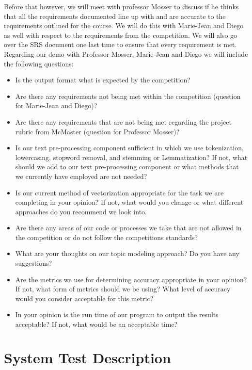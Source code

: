 \documentclass[12pt, titlepage]{article}
\begin{document}
  Before that however, we will meet with professor Mosser to discuss if he thinks that all the requirements documented line up with and are accurate to the requirements outlined for the course. We will do this with Marie-Jean and Diego as well with respect to the requirements from the competition. We will also go over the SRS document one last time to ensure that every requirement is met. \\  
  
  Regarding our demo with Professor Mosser, Marie-Jean and Diego we will include the following questions:
  
  \begin{itemize}
  \item Is the output format what is expected by the competition?
  \item Are there any requirements not being met within the competition (question for Marie-Jean and Diego)?
  \item Are there any requirements that are not being met regarding the project rubric from McMaster (question for Professor Mosser)?
  \item Is our text pre-processing component sufficient in which we use tokenization, lowercasing, stopword removal, and stemming or Lemmatization? If not, what should we add to our text pre-processing component or what methods that we currently have employed are not needed?
  \item Is our current method of vectorization appropriate for the task we are completing in your opinion? If not, what would you change or what different approaches do you recommend we look into.
  \item Are there any areas of our code or processes we take that are not allowed in the competition or do not follow the competitions standards?
  \item What are your thoughts on our topic modeling approach? Do you have any suggestions?
  \item Are the metrics we use for determining accuracy appropriate in your opinion? If not, what form of metrics should we be using? What level of accuracy would you consider acceptable for this metric?
  \item In your opinion is the run time of our program to output the results acceptable? If not, what would be an acceptable time?\end{itemize}
  

\section{System Test Description}
	
\end{document}

